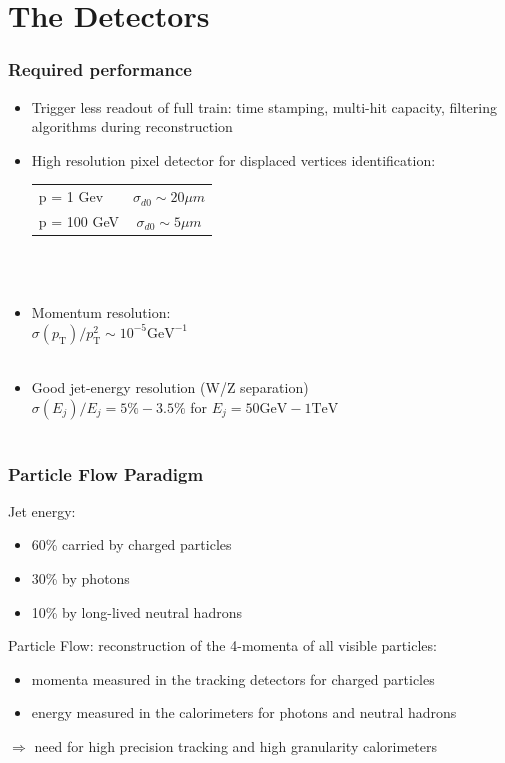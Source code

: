 \documentclass{beamer}
\begin{document}
\section[Detectors]{The Detectors}
\begin{frame}
\frametitle{Required performance}
\begin{itemize}
  \item Trigger less readout of full train: time stamping, multi-hit capacity,
  filtering algorithms during reconstruction
  \item High resolution pixel detector for displaced vertices identification:\\
  {\scriptsize
  \begin{tabular}{lc}
  p = 1 Gev & $\sigma_{d0}\sim20\mu m$\\
  p = 100 GeV & $\sigma_{d0}\sim5\mu m$
  \end{tabular}
  }~\\ ~\\
  \item Momentum resolution:\\
  {\scriptsize 
  $\sigma(p_{\textrm{T}})/p_{\textrm{T}}^2\sim 10^{-5}\textrm{GeV}^{-1}$
   }~\\ ~\\
  \item Good jet-energy resolution (W/Z separation)\\
  {\scriptsize 
$\sigma(E_j)/E_j = 5\%-3.5\%$ for $E_j = 50\textrm{GeV}-1\textrm{TeV}$
  }~\\ ~\\
\end{itemize}
\end{frame}
\begin{frame}
\frametitle{Particle Flow Paradigm}
Jet energy:
\begin{itemize}
  \item 60\% carried by charged particles
  \item 30\% by photons
  \item 10\% by long-lived neutral hadrons
\end{itemize}
Particle Flow: reconstruction of the \alert{4-momenta of all visible
particles}:
\begin{itemize}
  \item momenta measured in the tracking detectors for charged particles
  \item energy measured in the calorimeters for photons and neutral hadrons
\end{itemize}
$\Rightarrow$ need for \alert{high precision tracking and high granularity
calorimeters}
\end{frame}
\end{document}
